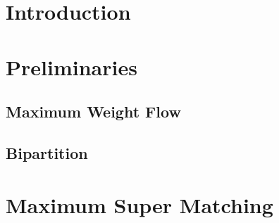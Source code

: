 \begin{abstract}

\end{abstract}

\section{Introduction}


\section{Preliminaries}
	\subsection{Maximum Weight Flow}
	
	\subsection{Bipartition}
	

\section{\FIXEDCARPOOL{}}


\section{\UWCARPOOL{}}


\section{\UCCARPOOL{}}


\section{Maximum Super Matching}


\section{\CARPOOL{}}
